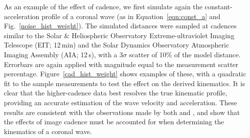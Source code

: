 \documentclass[structabstract]{aa}
\begin{document}
As an example of the effect of cadence, we first simulate again the constant-acceleration profile of a coronal wave (as in Equation~\ref{eqn:const_a} and Fig.~\ref{noise_hist_weight}). The simulated distances were sampled at cadences similar to the Solar \& Heliospheric Observatory \citep[\emph{SOHO};][]{1995SoPh..162....1D} Extreme-ultraviolet Imaging Telescope (EIT; 12\,min) and the Solar Dynamics Observatory \citep[\emph{SDO};][]{2012SoPh..275....3P} Atmospheric Imaging Assembly (AIA; 12\,s), with a $3\sigma$ scatter of 10\% of the model distance. Errorbars are again applied with magnitude equal to the measurement scatter percentage. Figure~\ref{cad_hist_weight} shows examples of these, with a quadratic fit to the sample measurements to test the effect on the derived kinematics. It is clear that the higher-cadence data best resolves the true kinematic profile, providing an accurate estimation of the wave velocity and acceleration. These results are consistent with the observations made by both \citet{2008ApJ...680L..81L} and \citet{2009ApJ...707..503M}, and show that the effects of image cadence must be accounted for when determining the kinematics of a coronal wave.
\end{document}
